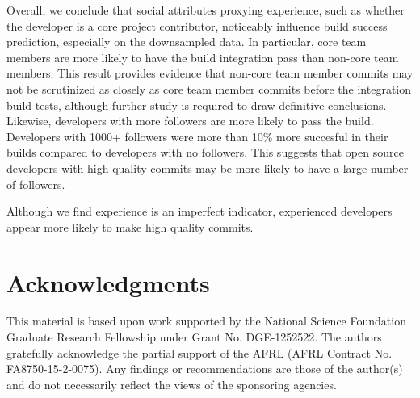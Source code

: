 \documentclass[10pt, conference]{IEEEtran}
\begin{document}
Overall, we conclude that social attributes proxying experience, such as whether
the developer is a core project contributor,
noticeably influence build success prediction, especially on the downsampled
data. 
%
In particular, core team members are
more likely to have the build integration pass than non-core team members.  This
result provides evidence that non-core team member commits may not be
scrutinized as closely as core team member commits before the integration build 
tests,
although further study is required to draw definitive
conclusions.
%
Likewise, developers with more followers are more
likely to pass the build.
Developers with 1000+ followers were more than 10\% more succesful in their
builds compared to
developers with no followers.  This suggests that open source developers with
high quality commits may be more
likely to have a large number of followers.

Although we find experience is an imperfect indicator, 
experienced developers appear more likely to make high quality commits.


\section*{Acknowledgments}
This material is based upon work supported by the National Science Foundation
Graduate Research Fellowship under Grant No. DGE-1252522.
The authors gratefully acknowledge the partial support
of the AFRL (AFRL Contract No. FA8750-15-2-0075). Any 
findings or recommendations are those of the author(s) and do not
necessarily reflect the views of the sponsoring agencies.





%
%
%

 
\balance




\end{document}

